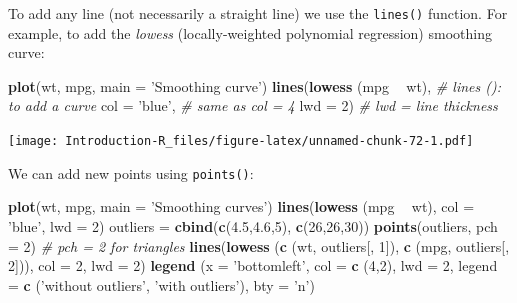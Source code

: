 \documentclass[]{book}
\newenvironment{Shaded}{\begin{snugshade}}{\end{snugshade}}
\newcommand{\CommentTok}[1]{\textcolor[rgb]{0.56,0.35,0.01}{\textit{#1}}}
\newcommand{\DataTypeTok}[1]{\textcolor[rgb]{0.13,0.29,0.53}{#1}}
\newcommand{\DecValTok}[1]{\textcolor[rgb]{0.00,0.00,0.81}{#1}}
\newcommand{\FloatTok}[1]{\textcolor[rgb]{0.00,0.00,0.81}{#1}}
\newcommand{\KeywordTok}[1]{\textcolor[rgb]{0.13,0.29,0.53}{\textbf{#1}}}
\newcommand{\NormalTok}[1]{#1}
\newcommand{\OperatorTok}[1]{\textcolor[rgb]{0.81,0.36,0.00}{\textbf{#1}}}
\newcommand{\StringTok}[1]{\textcolor[rgb]{0.31,0.60,0.02}{#1}}
\begin{document}
To add any line (not necessarily a straight line) we use the \texttt{lines()} function. For example, to add the \emph{lowess} (locally-weighted polynomial regression) smoothing curve:

\begin{Shaded}
\begin{Highlighting}[]
\KeywordTok{plot}\NormalTok{(wt, mpg, }\DataTypeTok{main =} \StringTok{'Smoothing curve'}\NormalTok{)}
\KeywordTok{lines}\NormalTok{(}\KeywordTok{lowess}\NormalTok{ (mpg }\OperatorTok{~}\StringTok{ }\NormalTok{wt), }\CommentTok{# lines (): to add a curve}
      \DataTypeTok{col =} \StringTok{'blue'}\NormalTok{, }\CommentTok{# same as col = 4}
      \DataTypeTok{lwd =} \DecValTok{2}\NormalTok{) }\CommentTok{# lwd = line thickness}
\end{Highlighting}
\end{Shaded}

\texttt{[image: Introduction-R\_files/figure-latex/unnamed-chunk-72-1.pdf]}

We can add new points using \texttt{points()}:

\begin{Shaded}
\begin{Highlighting}[]
\KeywordTok{plot}\NormalTok{(wt, mpg, }\DataTypeTok{main =} \StringTok{'Smoothing curves'}\NormalTok{)}
\KeywordTok{lines}\NormalTok{(}\KeywordTok{lowess}\NormalTok{ (mpg }\OperatorTok{~}\StringTok{ }\NormalTok{wt), }\DataTypeTok{col =} \StringTok{'blue'}\NormalTok{, }\DataTypeTok{lwd =} \DecValTok{2}\NormalTok{)}
\NormalTok{outliers =}\StringTok{ }\KeywordTok{cbind}\NormalTok{(}\KeywordTok{c}\NormalTok{(}\FloatTok{4.5}\NormalTok{,}\FloatTok{4.6}\NormalTok{,}\DecValTok{5}\NormalTok{), }\KeywordTok{c}\NormalTok{(}\DecValTok{26}\NormalTok{,}\DecValTok{26}\NormalTok{,}\DecValTok{30}\NormalTok{))}
\KeywordTok{points}\NormalTok{(outliers, }\DataTypeTok{pch =} \DecValTok{2}\NormalTok{) }\CommentTok{# pch = 2 for triangles}
\KeywordTok{lines}\NormalTok{(}\KeywordTok{lowess}\NormalTok{ (}\KeywordTok{c}\NormalTok{ (wt, outliers[, }\DecValTok{1}\NormalTok{]),}
              \KeywordTok{c}\NormalTok{ (mpg, outliers[, }\DecValTok{2}\NormalTok{])),}
      \DataTypeTok{col =} \DecValTok{2}\NormalTok{, }\DataTypeTok{lwd =} \DecValTok{2}\NormalTok{)}
\KeywordTok{legend}\NormalTok{ (}\DataTypeTok{x =} \StringTok{'bottomleft'}\NormalTok{, }\DataTypeTok{col =} \KeywordTok{c}\NormalTok{ (}\DecValTok{4}\NormalTok{,}\DecValTok{2}\NormalTok{), }\DataTypeTok{lwd =} \DecValTok{2}\NormalTok{, }\DataTypeTok{legend =} \KeywordTok{c}\NormalTok{ (}\StringTok{'without outliers'}\NormalTok{, }\StringTok{'with outliers'}\NormalTok{), }\DataTypeTok{bty =} \StringTok{'n'}\NormalTok{)}
\end{Highlighting}
\end{Shaded}
\end{document}
